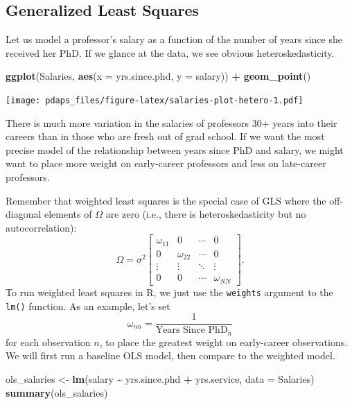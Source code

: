 \documentclass[
  12pt,
  oneside,openany]{book}
\newenvironment{Shaded}{\begin{snugshade}}{\end{snugshade}}
\newcommand{\DataTypeTok}[1]{\textcolor[rgb]{0.13,0.29,0.53}{#1}}
\newcommand{\KeywordTok}[1]{\textcolor[rgb]{0.13,0.29,0.53}{\textbf{#1}}}
\newcommand{\NormalTok}[1]{#1}
\newcommand{\OperatorTok}[1]{\textcolor[rgb]{0.81,0.36,0.00}{\textbf{#1}}}
\newcommand{\StringTok}[1]{\textcolor[rgb]{0.31,0.60,0.02}{#1}}
\begin{document}
\hypertarget{generalized-least-squares-1}{%
\subsection{Generalized Least Squares}\label{generalized-least-squares-1}}

Let us model a professor's salary as a function of the number of years since she received her PhD. If we glance at the data, we see obvious heteroskedasticity.

\begin{Shaded}
\begin{Highlighting}[]
\KeywordTok{ggplot}\NormalTok{(Salaries, }\KeywordTok{aes}\NormalTok{(}\DataTypeTok{x =}\NormalTok{ yrs.since.phd, }\DataTypeTok{y =}\NormalTok{ salary)) }\OperatorTok{+}
\StringTok{    }\KeywordTok{geom\_point}\NormalTok{()}
\end{Highlighting}
\end{Shaded}

\texttt{[image: pdaps\_files/figure-latex/salaries-plot-hetero-1.pdf]}

There is much more variation in the salaries of professors 30+ years into their careers than in those who are fresh out of grad school. If we want the most precise model of the relationship between years since PhD and salary, we might want to place more weight on early-career professors and less on late-career professors.

Remember that weighted least squares is the special case of GLS where the off-diagonal elements of \(\Omega\) are zero (i.e., there is heteroskedasticity but no autocorrelation):
\[
\Omega = \sigma^2 \begin{bmatrix}
  \omega_{11} & 0 & \cdots & 0 \\
  0 & \omega_{22} & \cdots & 0 \\
  \vdots & \vdots & \ddots & \vdots \\
  0 & 0 & \cdots & \omega_{NN}
\end{bmatrix}.
\]
To run weighted least squares in R, we just use the \texttt{weights} argument to the \texttt{lm()} function. As an example, let's set
\[
\omega_{nn} = \frac{1}{\text{Years Since PhD}_n}
\]
for each observation \(n\), to place the greatest weight on early-career observations. We will first run a baseline OLS model, then compare to the weighted model.

\begin{Shaded}
\begin{Highlighting}[]
\NormalTok{ols\_salaries \textless{}{-}}\StringTok{ }\KeywordTok{lm}\NormalTok{(salary }\OperatorTok{\textasciitilde{}}\StringTok{ }\NormalTok{yrs.since.phd }\OperatorTok{+}\StringTok{ }\NormalTok{yrs.service,}
                   \DataTypeTok{data =}\NormalTok{ Salaries)}
\KeywordTok{summary}\NormalTok{(ols\_salaries)}
\end{Highlighting}
\end{Shaded}
\end{document}
